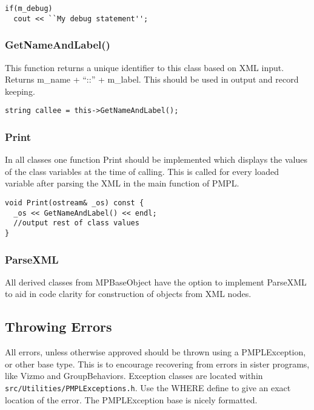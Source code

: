 \documentclass[12pt]{article}
\begin{document}
\begin{lstlisting}
if(m_debug)
  cout << ``My debug statement'';
\end{lstlisting}

\subsubsection{GetNameAndLabel()}

This function returns a unique identifier to this class based on XML input.
Returns m\_name + ``::'' + m\_label. This should be used in output and record
keeping.

\begin{lstlisting}
string callee = this->GetNameAndLabel();
\end{lstlisting}

\subsubsection{Print}

In all classes one function Print should be implemented which displays the
values of the class variables at the time of calling. This is called for every
loaded variable after parsing the XML in the main function of PMPL.

\begin{lstlisting}
void Print(ostream& _os) const {
  _os << GetNameAndLabel() << endl;
  //output rest of class values
}
\end{lstlisting}

\subsubsection{ParseXML}

All derived classes from MPBaseObject have the option to implement ParseXML to
aid in code clarity for construction of objects from XML nodes.

\subsection{Throwing Errors}

All errors, unless otherwise approved should be thrown using a PMPLException, or
other base type. This is to encourage recovering from errors in sister programs,
like Vizmo and GroupBehaviors. Exception classes are located within
\texttt{src/Utilities/PMPLExceptions.h}. Use the WHERE define to give an exact
location of the error. The PMPLException base is nicely formatted.
\end{document}
